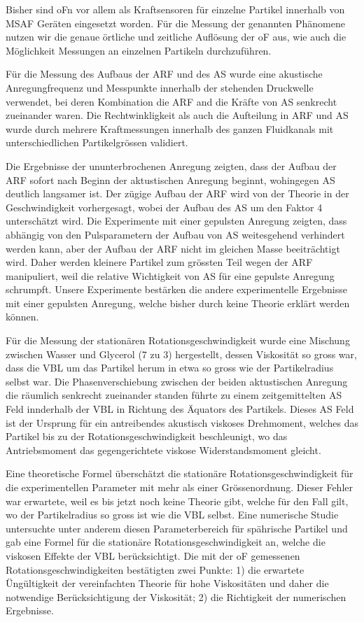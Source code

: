 Bisher sind oFn vor allem als Kraftsensoren für einzelne Partikel innerhalb von 
MSAF Geräten eingesetzt worden. Für die Messung der genannten Phänomene nutzen 
wir die genaue örtliche und zeitliche Auflösung der oF aus, wie auch die 
Möglichkeit Messungen an einzelnen Partikeln durchzuführen.

Für die Messung des Aufbaus der ARF und des AS wurde eine akustische 
Anregungfrequenz und Messpunkte innerhalb der stehenden Druckwelle verwendet, 
bei deren Kombination die ARF and die Kräfte von AS senkrecht zueinander waren.  
Die Rechtwinkligkeit als auch die Aufteilung in ARF und AS wurde durch mehrere 
Kraftmessungen innerhalb des ganzen Fluidkanals mit unterschiedlichen 
Partikelgrössen validiert.

Die Ergebnisse der ununterbrochenen Anregung zeigten, dass der Aufbau der ARF 
sofort nach Beginn der aktustischen Anregung beginnt, wohingegen AS deutlich 
langsamer ist. Der zügige Aufbau der ARF wird von der Theorie in der 
Geschwindigkeit vorhergesagt, wobei der Aufbau des AS um den Faktor 4 
unterschätzt wird. Die Experimente mit einer gepulsten Anregung zeigten, dass 
abhängig von den Pulsparametern der Aufbau von AS weitesgehend verhindert 
werden kann, aber der Aufbau der ARF nicht im gleichen Masse beeiträchtigt 
wird. Daher werden kleinere Partikel zum grössten Teil wegen der ARF 
manipuliert, weil die relative Wichtigkeit von AS für eine gepulste Anregung 
schrumpft. Unsere Experimente bestärken die andere experimentelle Ergebnisse 
mit einer gepulsten Anregung, welche bisher durch keine Theorie erklärt werden 
können.

Für die Messung der stationären Rotationsgeschwindigkeit wurde eine Mischung 
zwischen Wasser und Glycerol (7 zu 3) hergestellt, dessen Viskosität so gross 
war, dass die VBL um das Partikel herum in etwa so gross wie der Partikelradius 
selbst war. Die Phasenverschiebung zwischen der beiden aktustischen Anregung 
die räumlich senkrecht zueinander standen führte zu einem zeitgemittelten AS 
Feld innderhalb der VBL in Richtung des Äquators des Partikels. Dieses AS Feld 
ist der Ursprung für ein antreibendes akustisch viskoses Drehmoment, welches 
das Partikel bis zu der Rotationsgeschwindigkeit beschleunigt, wo das 
Antriebsmoment das gegengerichtete viskose Widerstandsmoment gleicht.

Eine theoretische Formel überschätzt die stationäre Rotationsgeschwindigkeit 
für die experimentellen Parameter mit mehr als einer Grössenordnung. Dieser 
Fehler war erwartete, weil es bis jetzt noch keine Theorie gibt, welche für den 
Fall gilt, wo der Partikelradius so gross ist wie die VBL selbst. Eine 
numerische Studie untersuchte unter anderem diesen Parameterbereich für 
spährische Partikel und gab eine Formel für die stationäre 
Rotationsgeschwindigkeit an, welche die viskosen Effekte der VBL 
berücksichtigt. Die mit der oF gemessenen Rotationsgeschwindigkeiten 
bestätigten zwei Punkte: 1) die erwartete Üngültigkeit der vereinfachten 
Theorie für hohe Viskositäten und daher die notwendige Berücksichtigung der 
Viskosität; 2) die Richtigkeit der numerischen Ergebnisse.
